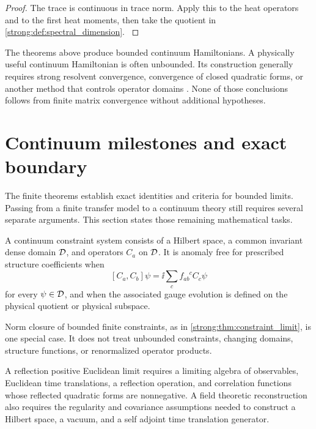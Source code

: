 \begin{proof}\label{strong:proof:079}
The trace is continuous in trace norm. Apply this to the heat operators and to the first heat moments, then take the quotient in \cref{strong:def:spectral_dimension}.
\label{strong:proof:079:end}\end{proof}

\begin{remark}\label{strong:remark:003}\label{strong:rem:unbounded_limit}
The theorems above produce bounded continuum Hamiltonians. A physically useful continuum Hamiltonian is often unbounded. Its construction generally requires strong resolvent convergence, convergence of closed quadratic forms, or another method that controls operator domains \cite{Kato1995,ReedSimon1972}. None of those conclusions follows from finite matrix convergence without additional hypotheses.
\end{remark}

\section{Continuum milestones and exact boundary}\label{strong:section:014}\label{strong:sec:boundary}

The finite theorems establish exact identities and criteria for bounded limits. Passing from a finite transfer model to a continuum theory still requires several separate arguments. This section states those remaining mathematical tasks.

\begin{definition}\label{strong:definition:011}\label{strong:def:anomaly_free_continuum}
A continuum constraint system consists of a Hilbert space, a common invariant dense domain \(\Dcal\), and operators \(C_a\) on \(\Dcal\). It is anomaly free for prescribed structure coefficients when
\[
[C_a,C_b]\psi
=
\ii\sum_cf_{ab}^{\phantom{ab}c}C_c\psi
\]
for every \(\psi\in\Dcal\), and when the associated gauge evolution is defined on the physical quotient or physical subspace.
\end{definition}

Norm closure of bounded finite constraints, as in \cref{strong:thm:constraint_limit}, is one special case. It does not treat unbounded constraints, changing domains, structure functions, or renormalized operator products.

\begin{definition}\label{strong:definition:012}\label{strong:def:reflection_positive_limit}
A reflection positive Euclidean limit requires a limiting algebra of observables, Euclidean time translations, a reflection operation, and correlation functions whose reflected quadratic forms are nonnegative. A field theoretic reconstruction also requires the regularity and covariance assumptions needed to construct a Hilbert space, a vacuum, and a self adjoint time translation generator.
\end{definition}

